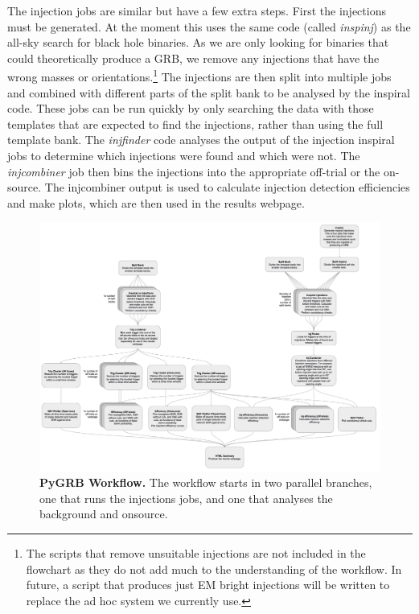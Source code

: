 \documentclass[11pt]{cuthesis}
\begin{document}
The injection jobs are similar but have a few extra steps. First the injections must be generated. At the moment this uses the same code (called \textit{inspinj}) as the all-sky search for black hole binaries. As we are only looking for binaries that could theoretically produce a GRB, we remove any injections that have the wrong masses or orientations.\footnote{The scripts that remove unsuitable injections are not included in the flowchart as they do not add much to the understanding of the workflow. In future, a script that produces just EM bright injections will be written to replace the ad hoc system we currently use.} The injections are then split into multiple jobs and combined with different parts of the split bank to be analysed by the inspiral code. These jobs can be run quickly by only searching the data with those templates that are expected to find the injections, rather than using the full template bank. The \textit{injfinder} code analyses the output of the injection inspiral jobs to determine which injections were found and which were not. The \textit{injcombiner} job then bins the injections into the appropriate off-trial or the on-source. The injcombiner output is used to calculate injection detection efficiencies and make plots, which are then used in the results webpage. 

\begin{figure} %
\begin{center}
\includegraphics[width=1.0\linewidth]{pygrb_flowchart.png}
\end{center}
\caption{\textbf{PyGRB Workflow.} The workflow starts in two parallel branches, one that runs the injections jobs, and one that analyses the background and onsource. }
\label{fig:pygrb flowchart}
\end{figure}
\end{document}
